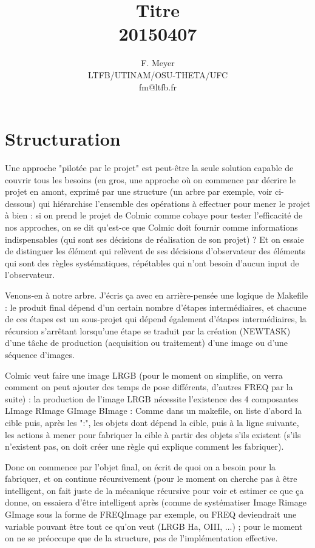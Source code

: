 \documentclass[10pt,a4paper,french]{article}
\title{Titre \\ 20150407}
\author{ F. Meyer\\ LTFB/UTINAM/OSU-THETA/UFC\\ fm@ltfb.fr}
\begin{document}
\maketitle
\parindent=0cm
\parskip=0.3cm
\section{Structuration}

Une approche "pilotée par le projet" est peut-être la seule solution capable de couvrir
tous les besoins (en gros, une approche où on commence par décrire le projet en amont,
exprimé par une structure (un arbre par exemple, voir ci-dessous) qui
hiérarchise l'ensemble des opérations à effectuer pour mener le projet à bien :
si on prend le projet de Colmic comme cobaye pour tester l'efficacité
de nos approches, on se dit qu'est-ce que Colmic doit fournir comme informations indispensables
(qui sont ses décisions de réalisation de son projet) ? Et on essaie de distinguer les élément qui
relèvent de ses décisions d'observateur des éléments qui sont des règles systématiques,
répétables qui n'ont besoin d'aucun input de l'observateur.

Venons-en à notre arbre. J'écris ça avec en arrière-pensée une logique de Makefile : le produit
final dépend d'un certain nombre d'étapes intermédiaires, et chacune de ces étapes est
un sous-projet qui dépend également d'étapes intermédiaires, la récursion s'arrêtant
lorsqu'une étape se traduit par la création (NEWTASK) d'une tâche de production (acquisition ou traitement) 
d'une image ou d'une séquence d'images.

Colmic veut faire une image LRGB (pour le moment on simplifie, on verra comment on peut
ajouter des temps de pose différents, d'autres FREQ par la suite) : la production de l'image
LRGB nécessite l'existence des 4 composantes LImage RImage GImage BImage :
Comme dans un makefile, on liste d'abord la cible puis, après les ":", les objets dont dépend
la cible, puis à la ligne suivante, les actions à mener pour fabriquer la cible à partir des objets
s'ils existent (s'ils n'existent pas, on doit créer une règle qui explique comment les fabriquer).

Donc on commence par l'objet final, on écrit de quoi on a besoin pour la fabriquer, et on
continue récursivement (pour le moment on cherche pas à être intelligent, on fait juste de
la mécanique récursive pour voir et estimer ce que ça donne, on essaiera d'être intelligent
après (comme de systématiser Image Rimage GImage sous la forme de FREQImage par exemple,
ou FREQ deviendrait une variable pouvant être tout ce qu'on veut (LRGB Ha, OIII, ...) ;
pour le moment on ne se préoccupe que de la structure, pas de l'implémentation effective.
\end{document}
